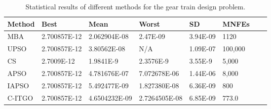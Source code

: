 
\begin{table*}[tp]
    \tiny
\begin{center}

\begin{tabular}{ P{2.0cm} P{2.0cm} P{2.0cm} P{2.0cm} P{2.0cm} P{2.0cm} P{2.0cm} P{2.0cm}  }
\hline
\textbf{Method} & \textbf{Best} & \textbf{Mean} & \textbf{Worst} & \textbf{SD} & \textbf{MNFEs} \\
\hline

MBA & 2.700857E-12 & 2.062904E-08 & 2.47E-09 & 3.94E-09 & 1120 \\
UPSO & 2.700857E-12 & 3.80562E-08 & N/A & 1.09E-07 & 100,000 \\
CS & 2.7009E-12 & 1.9841E-9 & 2.3576E-9 & 3.55E-9 & 5,000 \\
APSO & 2.700857E-12 & 4.781676E-07 & 7.072678E-06 & 1.44E-06 & 8,000 \\
IAPSO & 2.700857E-12 & 5.492477E-09 & 1.827380E-08 & 6.36E-09 & 800 \\
C-ITGO & 2.700857E-12 & 4.6504232E-09 & 2.7264505E-08 & 6.85E-09 & 773.0 \\


\hline
\end{tabular}
\end{center}
\vspace*{-6mm}
\caption{Statistical results of different methods for the gear train design problem. \\[1em]}
\label{tab:GT}
\end{table*}

